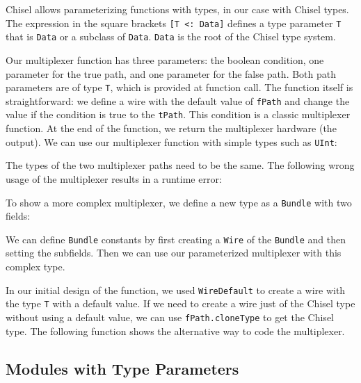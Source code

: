 \documentclass[%
    10pt,
    headinclude, footexclude,
    openright, %
    notitlepage,
    cleardoubleempty,
    headsepline,
    pointlessnumbers,
    bibtotoc, idxtotoc,
    ]{scrbook}
\newcommand{\code}[1]{{\lstinline[basicstyle=\small\ttfamily]{#1}}}
\begin{document}

Chisel allows parameterizing functions with types, in our case with Chisel
types. The expression in the square brackets \code{[T <: Data]} defines
a type parameter \code{T} that is \code{Data} or a subclass of \code{Data}.
\code{Data} is the root of the Chisel type system.

Our multiplexer function has three parameters: the boolean condition,
one parameter for the true path, and one parameter for the false path.
Both path parameters are of type \code{T}, which is
provided at function call. The function itself is straightforward:
we define a wire with the default value of \code{fPath} and
change the value if the condition is true to the \code{tPath}.
This condition is a classic multiplexer function.
At the end of the function, we return the multiplexer hardware (the output).
We can use our multiplexer function with simple types such as
\code{UInt}:


\noindent The types of the two multiplexer paths need to be the same.
The following wrong usage of the multiplexer results in a runtime error:


\noindent To show a more complex multiplexer, we define a new type as a \code{Bundle} with two fields:


\noindent We can define \code{Bundle} constants by first creating
a \code{Wire} of the \code{Bundle} and then setting the subfields.
Then we can use our parameterized multiplexer with this complex type.


In our initial design of the function, we used \code{WireDefault}
to create a wire with the type \code{T} with a default value.
If we need to create a wire just of the Chisel type without using a default
value, we can use \code{fPath.cloneType} to get the Chisel type.
The following function shows the alternative way to code the multiplexer.


\subsection{Modules with Type Parameters}
\end{document}
